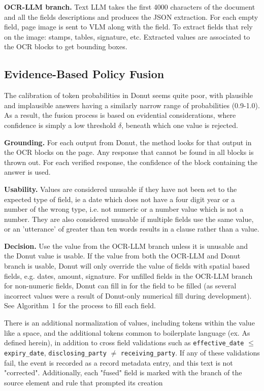 \documentclass[conference]{IEEEtran}
\begin{document}
\textbf{OCR-LLM branch.} Text LLM takes the first 4000 characters of the document and all the fields descriptions and produces the JSON extraction. For each empty field, page image is sent to VLM along with the field. To extract fields that rely on the image: stamps, tables, signature, etc. Extracted values are associated to the OCR blocks to get bounding boxes.

\subsection{Evidence-Based Policy Fusion}
\label{sec:fusion}

The calibration of token probabilities in Donut seems quite poor, with plausible and implausible answers having a similarly narrow range of probabilities (0.9-1.0). As a result, the fusion process is based on evidential considerations, where confidence is simply a low threshold $\delta$, beneath which one value is rejected.

\textbf{Grounding.} For each output from Donut, the method looks for that output in the OCR blocks on the page. Any response that cannot be found in all blocks is thrown out. For each verified response, the confidence of the block containing the answer is used.

\textbf{Usability.} Values are considered unusable if they have not been set to the expected type of field, ie a date which does not have a four digit year or a number of the wrong type, i.e. not numeric or a number value which is not a number. They are also considered unusable if multiple fields use the same value, or an 'utterance' of greater than ten words results in a clause rather than a value.

\textbf{Decision.}  Use the value from the OCR-LLM branch unless it is unusable and the Donut value is usable. If the value from both the OCR-LLM and Donut branch is usable, Donut will only override the value of fields with spatial based fields, e.g. dates, amount, signature. For unfilled fields in the OCR-LLM branch for non-numeric fields, Donut can fill in for the field to be filled (as several incorrect values were a result of Donut-only numerical fill during development). See Algorithm~1 for the process to fill each field.

There is an additional normalization of values, including tokens within the value like a space, and the additional tokens common to boilerplate language (ex. As defined herein), in addition to cross field validations such as \texttt{effective\_date} $\leq$ \texttt{expiry\_date}, \texttt{disclosing\_party} $\neq$ \texttt{receiving\_party}. If any of these validations fail, the event is recorded as a record metadata entry, and this text is not "corrected". Additionally, each "fused" field is marked with the branch of the source element and rule that prompted its creation
\end{document}
